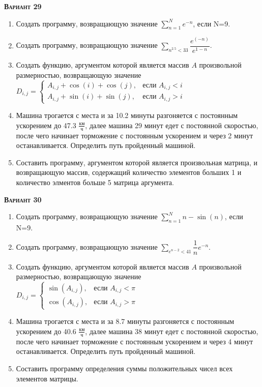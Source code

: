 \textsc{\textbf{Вариант 29}}
\begin{enumerate}
\item  Создать программу, возвращающую значение $\sum\limits_{n=1}^{N} {e^{-n}}                      $, если N=9. 
\item  Создать программу, возвращающую значение $\sum\limits_{n^{2.5}<  33} \dfrac{e^(-n)}{e^{1-n}}       $. 
\item Создать функцию, аргументом которой является массив $A$ произвольной размерностью, возвращающую значение $D_{i,j}=\begin{cases} A_{i,j}+\cos(i)+\cos(j), & \text{если } {A_{i,j}}<i \\  A_{i,j}+\sin(i)+\sin(j), & \text{если } {A_{i,j}}>i \end{cases}$ 
\item Машина трогается с места и за 10.2 минуты разгоняется с постоянным ускорением до 47.3 ${\frac{км}{ч}}$, далее машина   29 минут едет с постоянной скоростью, после чего начинает торможение с постоянным ускорением и через   2 минут останавливается. Определить путь пройденный машиной.  \item Составить программу, аргументом которой является произвольная матрица, и возвращающую массив, содержащий количество элементов больших 1 и количество элментов больше 5 матрица аргумента.

\end{enumerate}
\textsc{\textbf{Вариант 30}}
\begin{enumerate}
\item  Создать программу, возвращающую значение $\sum\limits_{n=1}^{N} n-\sin(n)                     $, если N=9. 
\item  Создать программу, возвращающую значение $\sum\limits_{e^{n-2}<  41} {\dfrac{1}{n} e^{-n}}         $. 
\item Создать функцию, аргументом которой является массив $A$ произвольной размерностью, возвращающую значение $D_{i,j}=\begin{cases} \sin(A_{i,j}), & \text{если } A_{i,j}<\pi \\ \cos(A_{i,j}), & \text{если } A_{i,j}>\pi \end{cases}                     $ 
\item Машина трогается с места и за  8.7 минуты разгоняется с постоянным ускорением до 40.6 ${\frac{км}{ч}}$, далее машина   38 минут едет с постоянной скоростью, после чего начинает торможение с постоянным ускорением и через   4 минут останавливается. Определить путь пройденный машиной.  \item Составить программу определения суммы положительных чисел всех элементов матрицы.                                                                                                                                                                                              

\end{enumerate}
